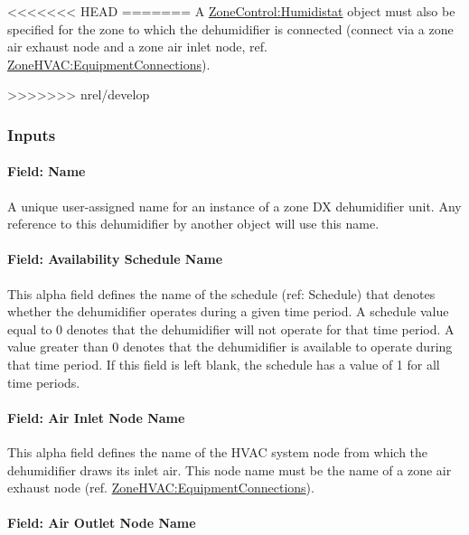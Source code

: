<<<<<<< HEAD
=======
A \hyperref[zonecontrolhumidistat]{ZoneControl:Humidistat} object must also be specified for the zone to which the dehumidifier is connected (connect via a zone air exhaust node and a zone air inlet node, ref. \hyperref[zonehvacequipmentconnections]{ZoneHVAC:EquipmentConnections}).

>>>>>>> nrel/develop
\subsubsection{Inputs}\label{inputs-12-021}

\paragraph{Field: Name}\label{field-name-12-014}

A unique user-assigned name for an instance of a zone DX dehumidifier unit. Any reference to this dehumidifier by another object will use this name.

\paragraph{Field: Availability Schedule Name}\label{field-availability-schedule-name-11-001}

This alpha field defines the name of the schedule (ref: Schedule) that denotes whether the dehumidifier operates during a given time period. A schedule value equal to 0 denotes that the dehumidifier will not operate for that time period. A value greater than 0 denotes that the dehumidifier is available to operate during that time period. If this field is left blank, the schedule has a value of 1 for all time periods.

\paragraph{Field: Air Inlet Node Name}\label{field-air-inlet-node-name-9-000}

This alpha field defines the name of the HVAC system node from which the dehumidifier draws its inlet air. This node name must be the name of a zone air exhaust node (ref. \hyperref[zonehvacequipmentconnections]{ZoneHVAC:EquipmentConnections}).

\paragraph{Field: Air Outlet Node Name}\label{field-air-outlet-node-name-9-001}

